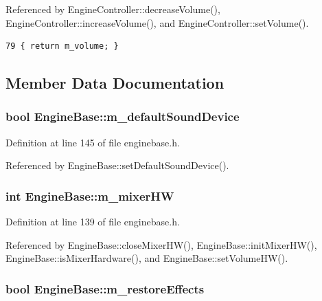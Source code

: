 Referenced by Engine\-Controller::decrease\-Volume(), Engine\-Controller::increase\-Volume(), and Engine\-Controller::set\-Volume().



\footnotesize\begin{verbatim}79 { return m_volume; }
\end{verbatim}\normalsize 


\subsection{Member Data Documentation}
\subsubsection{\setlength{\rightskip}{0pt plus 5cm}bool {\bf Engine\-Base::m\_\-default\-Sound\-Device}\hspace{0.3cm}{\tt  [protected, inherited]}}\label{classEngineBase_EngineBasep6}




Definition at line 145 of file enginebase.h.

Referenced by Engine\-Base::set\-Default\-Sound\-Device().
\subsubsection{\setlength{\rightskip}{0pt plus 5cm}int {\bf Engine\-Base::m\_\-mixer\-HW}\hspace{0.3cm}{\tt  [protected, inherited]}}\label{classEngineBase_EngineBasep0}




Definition at line 139 of file enginebase.h.

Referenced by Engine\-Base::close\-Mixer\-HW(), Engine\-Base::init\-Mixer\-HW(), Engine\-Base::is\-Mixer\-Hardware(), and Engine\-Base::set\-Volume\-HW().
\subsubsection{\setlength{\rightskip}{0pt plus 5cm}bool {\bf Engine\-Base::m\_\-restore\-Effects}\hspace{0.3cm}{\tt  [protected, inherited]}}\label{classEngineBase_EngineBasep3}




